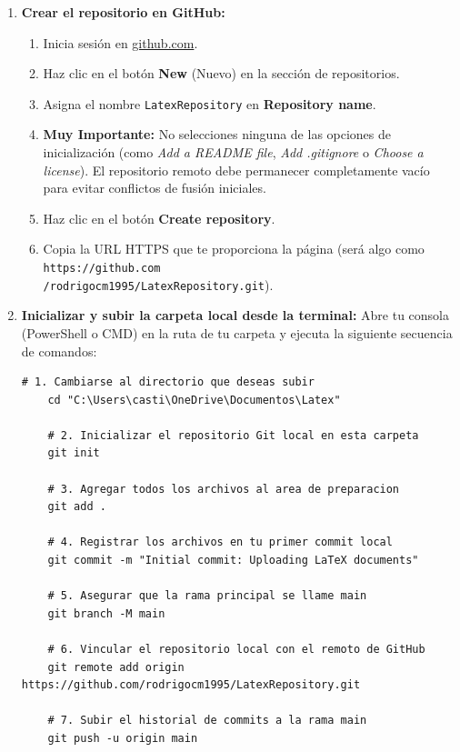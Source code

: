 \documentclass[
10pt, %
a4paper, %
oneside, %
headinclude,footinclude, %
BCOR5mm, %
]{scrartcl}
\begin{document}
\begin{enumerate}
	\item \textbf{Crear el repositorio en GitHub:}
	\begin{enumerate}
		\item Inicia sesión en \href{https://github.com}{github.com}.
		\item Haz clic en el botón \textbf{New} (Nuevo) en la sección de repositorios.
		\item Asigna el nombre \texttt{LatexRepository} en \textbf{Repository name}.
		\item \textbf{Muy Importante:} No selecciones ninguna de las opciones de inicialización (como \textit{Add a README file}, \textit{Add .gitignore} o \textit{Choose a license}). El repositorio remoto debe permanecer completamente vacío para evitar conflictos de fusión iniciales.
		\item Haz clic en el botón \textbf{Create repository}.
		\item Copia la URL HTTPS que te proporciona la página (será algo como \texttt{https://github.com\\/rodrigocm1995/LatexRepository.git}).
	\end{enumerate}
	
	\item \textbf{Inicializar y subir la carpeta local desde la terminal:}
	Abre tu consola (PowerShell o CMD) en la ruta de tu carpeta y ejecuta la siguiente secuencia de comandos:
	\begin{lstlisting}[language=DOS]
	# 1. Cambiarse al directorio que deseas subir
	cd "C:\Users\casti\OneDrive\Documentos\Latex"
	
	# 2. Inicializar el repositorio Git local en esta carpeta
	git init
	
	# 3. Agregar todos los archivos al area de preparacion
	git add .
	
	# 4. Registrar los archivos en tu primer commit local
	git commit -m "Initial commit: Uploading LaTeX documents"
	
	# 5. Asegurar que la rama principal se llame main
	git branch -M main
	
	# 6. Vincular el repositorio local con el remoto de GitHub
	git remote add origin https://github.com/rodrigocm1995/LatexRepository.git
	
	# 7. Subir el historial de commits a la rama main
	git push -u origin main
	\end{lstlisting}
\end{enumerate}
\end{document}
